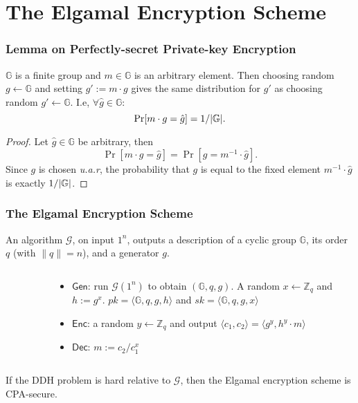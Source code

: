 \section{The Elgamal Encryption Scheme}
\begin{frame}\frametitle{Lemma on Perfectly-secret Private-key Encryption}
\begin{lemma}\label{lem:ps}
$\mathbb{G}$ is a finite group and $m\in \mathbb{G}$ is an arbitrary element. Then choosing random $g \gets \mathbb{G}$ and setting $g' := m\cdot g$ gives the same distribution for $g'$ as choosing random $g' \gets \mathbb{G}$. I.e, $\forall \hat{g} \in \mathbb{G}$:
\[ \Pr[m\cdot g = \hat{g}] = 1/\lvert\mathbb{G}\rvert. \]
\end{lemma}
\begin{proof}
Let $\hat{g} \in \mathbb{G}$ be arbitrary, then
\[\Pr[m\cdot g = \hat{g}] = \Pr[g = m^{-1}\cdot \hat{g}]. \]
Since $g$ is chosen \emph{u.a.r}, the probability that $g$ is equal to the fixed element $m^{-1}\cdot \hat{g}$ is exactly $1/\lvert\mathbb{G}\rvert$.
\end{proof}
\end{frame}
\begin{frame}\frametitle{The Elgamal Encryption Scheme}
An algorithm $\mathcal{G}$, on input $1^n$, outputs a description of a cyclic group $\mathbb{G}$, its order $q$ (with $\|q\| = n$), and a generator $g$.
\begin{columns}[]
\begin{column}{5cm}
\begin{figure}
\begin{center}

\end{center}
\end{figure}
\end{column}
\begin{column}{6cm}
\begin{construction}
\begin{itemize}
\item $\mathsf{Gen}$: run $\mathcal{G}(1^n)$ to obtain $(\mathbb{G},q,g)$. A random $x \gets \mathbb{Z}_q$ and $h := g^x$.  $pk = \langle \mathbb{G},q,g,h \rangle$ and $sk = \langle \mathbb{G},q,g,x \rangle$
\item $\mathsf{Enc}$: a random $y \gets \mathbb{Z}_q$ and output $\langle c_1, c_2 \rangle = \langle g^y, h^y\cdot m\rangle$
\item $\mathsf{Dec}$: $m:=c_2/c_1^x$
\end{itemize}
\end{construction}
\end{column}
\end{columns}
\begin{theorem}
If the DDH problem is hard relative to $\mathcal{G}$, then the Elgamal encryption scheme is CPA-secure.
\end{theorem}
\end{frame}
